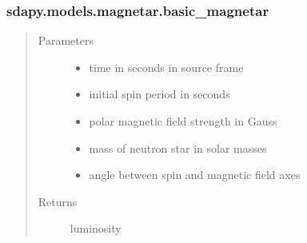\documentclass[letterpaper,10pt,english]{sphinxmanual}
\begin{document}
\subsubsection{sdapy.models.magnetar.basic\_magnetar}
\label{\detokenize{generated/sdapy.models.magnetar.basic_magnetar:sdapy-models-magnetar-basic-magnetar}}\label{\detokenize{generated/sdapy.models.magnetar.basic_magnetar::doc}}

\begin{fulllineitems}
\label{\detokenize{generated/sdapy.models.magnetar.basic_magnetar:sdapy.models.magnetar.basic_magnetar}}
\begin{quote}\begin{description}
\item[{Parameters}] \leavevmode\begin{itemize}
\item {} 
 \textendash{} time in seconds in source frame

\item {} 
 \textendash{} initial spin period in seconds

\item {} 
 \textendash{} polar magnetic field strength in Gauss

\item {} 
 \textendash{} mass of neutron star in solar masses

\item {} 
 \textendash{} angle between spin and magnetic field axes

\end{itemize}

\item[{Returns}] \leavevmode
luminosity

\end{description}\end{quote}

\end{fulllineitems}
\end{document}
